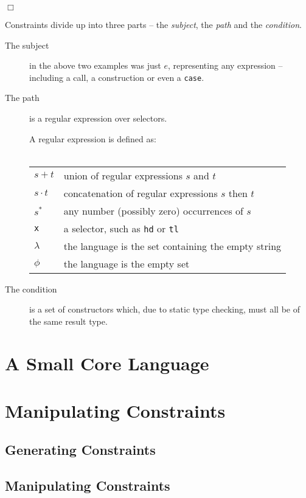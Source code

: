 \documentclass[preprint]{sigplanconf}
\newcommand{\T}[1]{\texttt{#1}}
\newcommand{\noexample}{\hfill$\Box$}
\newcommand{\K}{\ensuremath{^\ast}} %
\newcommand{\D}{\ensuremath{\cdot}} %
\begin{document}
\noexample

Constraints divide up into three parts -- the \textit{subject}, the
\textit{path} and the \textit{condition}.

\begin{description}
\item[The subject] in the above two examples was just $e$,
representing any expression -- including a call, a construction or
even a \T{case}.

\item[The path] is a regular expression over selectors.

A regular expression is defined as:\\ \\
\begin{tabular}{ll}
$s+t$ & union of regular expressions $s$ and $t$ \\
$s\D t$ & concatenation of regular expressions $s$ then $t$ \\
$s\K$  & any number (possibly zero) occurrences of $s$ \\
\T{x} & a selector, such as \T{hd} or \T{tl} \\
$\lambda$ & the language is the set containing the empty string \\
$\phi$ & the language is the empty set
\end{tabular}

\item[The condition] is a set of constructors which, due to static type
checking, must all be of the same result type.
\end{description}


\section{A Small Core Language}



\section{Manipulating Constraints}

\subsection{Generating Constraints}



\subsection{Manipulating Constraints}
\end{document}
